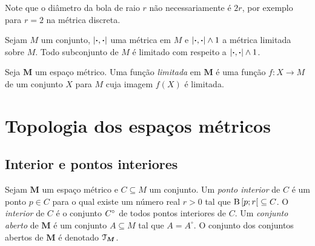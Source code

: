 Note que o diâmetro da bola de raio $r$ não necessariamente é $2r$, por exemplo para $r=2$ na métrica discreta.

\begin{exercise}
Sejam $M$ um conjunto, $\left\vert{\bm{\cdot}},{\bm{\cdot}}\right\vert$ uma métrica em $M$ e $\left\vert{\bm{\cdot}},{\bm{\cdot}}\right\vert \mathbin{\wedge} 1$ a métrica limitada sobre $M$. Todo subconjunto de $M$ é limitado com respeito a $\left\vert{\bm{\cdot}},{\bm{\cdot}}\right\vert \mathbin{\wedge} 1$.
\end{exercise}

\begin{definition}
Seja $\bm M$ um espaço métrico. Uma função \emph{limitada} em $\bm M$ é uma função $f\colon X \to M$ de um conjunto $X$ para $M$ cuja imagem $f(X)$ é limitada.
\end{definition}

\section{Topologia dos espaços métricos}

\subsection{Interior e pontos interiores}

\begin{definition}
Sejam $\bm M$ um espaço métrico e $C \subseteq M$ um conjunto. Um \emph{ponto interior} de $C$ é um ponto $p \in C$ para o qual existe um número real $r > 0$ tal que $\mathrm{B}\left[{p};{r}\right[ \subseteq C$. O \emph{interior} de $C$ é o conjunto ${C}^\circ$ de todos pontos interiores de $C$. Um \emph{conjunto aberto} de $\bm M$ é um conjunto $A \subseteq M$ tal que $A = A^\circ$. O conjunto dos conjuntos abertos de $\bm M$ é denotado $\mathcal{T}_{\bm M}$.
\end{definition}

